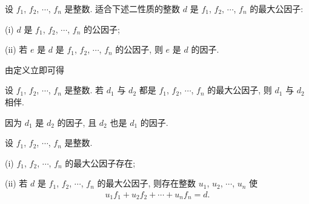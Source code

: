 \begin{definition}
    设 $f_1$, $f_2$, $\cdots$, $f_n$ 是整数. 适合下述二性质的整数 $d$ 是 $f_1$, $f_2$, $\cdots$, $f_n$ 的最大公因子:

    (i) $d$ 是 $f_1$, $f_2$, $\cdots$, $f_n$ 的公因子;

    (ii) 若 $e$ 是 $d$ 是 $f_1$, $f_2$, $\cdots$, $f_n$ 的公因子, 则 $e$ 是 $d$ 的因子.
\end{definition}

由定义立即可得
\begin{proposition}
    设 $f_1$, $f_2$, $\cdots$, $f_n$ 是整数. 若 $d_1$ 与 $d_2$ 都是 $f_1$, $f_2$, $\cdots$, $f_n$ 的最大公因子, 则 $d_1$ 与 $d_2$ 相伴.
\end{proposition}

\begin{pf}
    因为 $d_1$ 是 $d_2$ 的因子, 且 $d_2$ 也是 $d_1$ 的因子.
\end{pf}

\begin{proposition}
    设 $f_1$, $f_2$, $\cdots$, $f_n$ 是整数.

    (i) $f_1$, $f_2$, $\cdots$, $f_n$ 的最大公因子存在;

    (ii) 若 $d$ 是 $f_1$, $f_2$, $\cdots$, $f_n$ 的最大公因子, 则存在整数 $u_1$, $u_2$, $\cdots$, $u_n$ 使
    \begin{align*}
        u_1 f_1 + u_2 f_2 + \cdots + u_n f_n = d.
    \end{align*}
\end{proposition}

